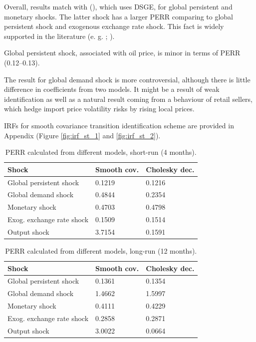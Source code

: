 \documentclass[12pt, a4paper]{extarticle}
\begin{document}
Overall, results match with (\cite{Khotulev2020}), which uses DSGE, for global persistent and monetary shocks. The latter shock has a larger PERR comparing to global persistent shock and exogenous exchange rate shock. This fact is widely supported in the literature (e. g. \cite[p. 43]{Ortega2020}; \cite[p. 9]{Khotulev2020}). 

Global persistent shock, associated with oil price, is minor in terms of PERR (0.12--0.13).  

The result for global demand shock is more controversial, although there is little difference in coefficients from two models. It might be a result of weak identification as well as a natural result coming from a behaviour of retail sellers, which hedge import price volatility risks by rising local prices.



IRFs for smooth covariance transition identification scheme are provided in Appendix (Figure \ref{fig:irf_st_1} and \ref{fig:irf_st_2}). 

\begin{table}[t]
	\centering
		\begin{tabular}{@{}lll@{}}
			\toprule
			Shock                     & Smooth cov. & Cholesky dec. \\
			\midrule
			Global persistent shock   & 0.1219      & 0.1216        \\
			Global demand shock       & 0.4844      & 0.2354        \\
			Monetary shock            & 0.4703     & 0.4798        \\
			Exog. exchange rate shock & 0.1509      & 0.1514        \\
			Output shock              & 3.7154      & 0.1591       \\
			\bottomrule
		\end{tabular}%
	\caption{PERR calculated from different models, short-run (4 months).}
	\label{tab:perr_shortrun}
\end{table}

\begin{table}[t]
	\centering
		\begin{tabular}{@{}lll@{}}
			\toprule
			Shock                     & Smooth cov. & Cholesky dec. \\
			\midrule
			Global persistent shock   & 0.1361      & 0.1354        \\
			Global demand shock       & 1.4662      & 1.5997        \\
			Monetary shock            & 0.4111      &0.4229        \\
			Exog. exchange rate shock & 0.2858      & 0.2871        \\
			Output shock              & 3.0022      &0.0664    \\   
			\bottomrule
		\end{tabular}%
	\caption{PERR calculated from different models, long-run (12 months).}
	\label{tab:perr_longrun}
\end{table}
\end{document}
